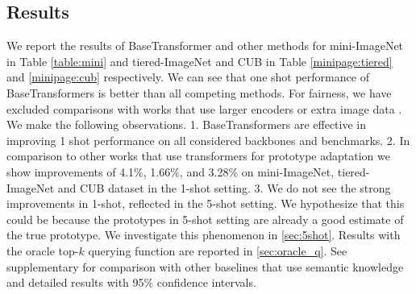 \documentclass{bmvc2k}
\begin{document}
\subsection{Results}

We report the results of BaseTransformer and other methods for mini-ImageNet in Table \ref{table:mini} and tiered-ImageNet and CUB in Table \ref{minipage:tiered} and \ref{minipage:cub} respectively. We can see that one shot performance of BaseTransformers is better than all competing methods. For fairness, we have excluded comparisons with works that use larger encoders or extra image data \cite{yang2021free}.
We make the following observations. 1. BaseTransformers are effective in improving 1 shot performance on all considered backbones and benchmarks. 2. In comparison to other works \cite{ye2020few,hou2019cross} that use transformers for prototype adaptation we show improvements of 4.1\%, 1.66\%,  and 3.28\% on mini-ImageNet, tiered-ImageNet and CUB dataset in the 1-shot setting. 3. We do not see the strong improvements in 1-shot, reflected in the 5-shot setting. We hypothesize that this could be because the prototypes in 5-shot setting are already a good estimate of the true prototype. We investigate this phenomenon in \ref{sec:5shot}. Results with the oracle top-$k$ querying function are reported in \ref{sec:oracle_q}. See supplementary for comparison with other baselines that use semantic knowledge and detailed results with 95\% confidence intervals.
\end{document}

